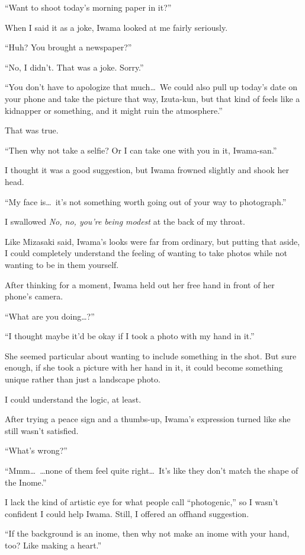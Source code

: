 \documentclass[
    a4paper,
    12pt,
    twoside,
    openany,
    UTF8,
    fontset=windows
]{ctexbook}
\begin{document}
``Want to shoot today's morning paper in it?''

When I said it as a joke, Iwama looked at me fairly seriously.

``Huh? You brought a newspaper?''

``No, I didn't. That was a joke. Sorry.''

``You don't have to apologize that much\dots\ We could also pull up today's date on your phone and take the picture that way, Izuta-kun, but that kind of feels like a kidnapper or something, and it might ruin the atmosphere.''

That was true.

``Then why not take a selfie? Or I can take one with you in it, Iwama-san.''

I thought it was a good suggestion, but Iwama frowned slightly and shook her head.

``My face is\dots\ it's not something worth going out of your way to photograph.''

I swallowed \textit{No, no, you're being modest} at the back of my throat.

Like Mizasaki said, Iwama's looks were far from ordinary, but putting that aside, I could completely understand the feeling of wanting to take photos while not wanting to be in them yourself.

After thinking for a moment, Iwama held out her free hand in front of her phone's camera.

``What are you doing\dots?''

``I thought maybe it'd be okay if I took a photo with my hand in it.''

She seemed particular about wanting to include something in the shot. But sure enough, if she took a picture with her hand in it, it could become something unique rather than just a landscape photo.

I could understand the logic, at least.

After trying a peace sign and a thumbs-up, Iwama's expression turned like she still wasn't satisfied.

``What's wrong?''

``Mmm\dots\ \dots none of them feel quite right\dots\ It's like they don't match the shape of the Inome.''

I lack the kind of artistic eye for what people call ``photogenic,'' so I wasn't confident I could help Iwama. Still, I offered an offhand suggestion.

``If the background is an inome, then why not make an inome with your hand, too? Like making a heart.''
\end{document}

